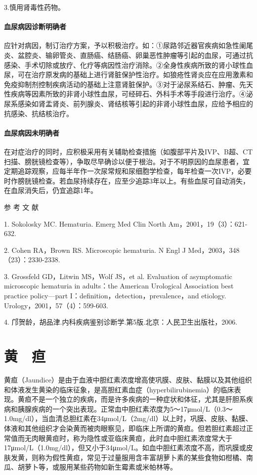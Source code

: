 3.慎用肾毒性药物。

\subsubsection{血尿病因诊断明确者}

应针对病因，制订治疗方案，予以积极治疗。如：①尿路邻近器官疾病如急性阑尾炎、盆腔炎、输卵管炎、直肠癌、结肠癌、卵巢恶性肿瘤等引起的血尿，可通过抗感染、手术切除或放疗、化疗等病因性治疗消除。②全身性疾病所致的肾小球性血尿，可在治疗原发病的基础上进行肾脏保护性治疗。如狼疮性肾炎应在应用激素和免疫抑制剂控制疾病活动的基础上注意肾脏保护。③对于泌尿系结石、肿瘤、先天性疾病等因素所致的非肾小球性血尿，可经碎石、外科手术等手段进行治疗。④泌尿系感染如肾盂肾炎、前列腺炎、肾结核等引起的非肾小球性血尿，应给予相应的抗感染、抗结核治疗。

\subsubsection{血尿病因未明确者}

在对症治疗的同时，应积极采用有关辅助检查措施（如腹部平片及IVP、B超、CT扫描、膀胱镜检查等），争取尽早确诊以便于根治。对于不明原因的血尿患者，宜定期追踪观察，应每半年作一次尿常规和尿细胞学检查，每年检查一次IVP，必要时作膀胱镜检查。若血尿持续存在，应至少追踪3年以上。有些血尿可自动消失，在血尿消失后，仍宜追踪1年。

\protect\hypertarget{text00038.html}{}{}

\hypertarget{text00038.htmlux5cux23CHP1-15-4}{}
参 考 文 献

1. Sokolosky MC. Hematuria. Emerg Med Clin North
Am，2001，19（3）：621-632.

2. Cohen RA，Brown RS. Microscopic hematuria. N Engl J
Med，2003，348（23）：2330-2338.

3. Grossfeld GD，Litwin MS，Wolf JS，et al. Evaluation of asymptomatic
microscopic hematuria in adults：the American Urological Association
best practice policy---part I：definition，detection，prevalence，and
etiology. Urology，2001，57（4）：599-603.

4. 邝贺龄，胡品津.内科疾病鉴别诊断学.第5版.北京：人民卫生出版社，2006.

\protect\hypertarget{text00039.html}{}{}

\chapter{黄　疸}

黄疸（Jaundice）是由于血液中胆红素浓度增高使巩膜、皮肤、黏膜以及其他组织和体液发生黄染的临床征象，是高胆红素血症（hyperbilirubinemia）的临床表现。黄疸不是一个独立的疾病，而是许多疾病的一种症状和体征，尤其是肝胆系疾病和胰腺疾病的一个突出表现。正常血中胆红素浓度为5～17μmol/L（0.3～1.0mg/dl），当血清总胆红素在34μmol/L（2mg/dl）以上时，巩膜、皮肤、黏膜、体液和其他组织才会染黄而被肉眼察见，即临床上所谓的黄疸。但若胆红素超过正常值而无肉眼黄疸时，称为隐性或亚临床黄疸，此时血中胆红素浓度常大于17μmol/L（1.0mg/dl），但又小于34μmol/L。如血中胆红素浓度不高，而巩膜或皮肤发黄，则称为假性黄疸，常见于过量服用含丰富胡萝卜素的某些食物如柑橘、南瓜、胡萝卜等，或服用某些药物如新生霉素或米帕林等。

